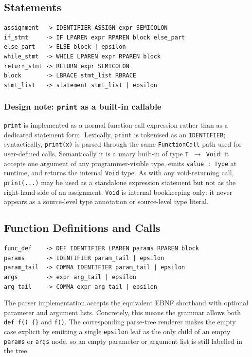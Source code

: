 \subsection{Statements}
\begin{lstlisting}
assignment  -> IDENTIFIER ASSIGN expr SEMICOLON
if_stmt     -> IF LPAREN expr RPAREN block else_part
else_part   -> ELSE block | epsilon
while_stmt  -> WHILE LPAREN expr RPAREN block
return_stmt -> RETURN expr SEMICOLON
block       -> LBRACE stmt_list RBRACE
stmt_list   -> statement stmt_list | epsilon
\end{lstlisting}

\subsubsection*{Design note: \texttt{print} as a built-in callable}
\texttt{print} is implemented as a normal function-call expression rather than
as a dedicated statement form. Lexically, \texttt{print} is tokenised as an
\texttt{IDENTIFIER}; syntactically, \texttt{print(x)} is parsed through the same
\texttt{FunctionCall} path used for user-defined calls. Semantically it is a
unary built-in of type \texttt{T $\rightarrow$ Void}: it accepts one argument
of any programmer-visible type, emits \texttt{value : Type} at runtime, and
returns the internal \texttt{Void} type. As with any void-returning call,
\texttt{print(...)} may be used as a standalone expression statement but not as
the right-hand side of an assignment.
\texttt{Void} is internal bookkeeping only: it never appears as a source-level
type annotation or source-level type literal.

\subsection{Function Definitions and Calls}
\begin{lstlisting}
func_def    -> DEF IDENTIFIER LPAREN params RPAREN block
params      -> IDENTIFIER param_tail | epsilon
param_tail  -> COMMA IDENTIFIER param_tail | epsilon
args        -> expr arg_tail | epsilon
arg_tail    -> COMMA expr arg_tail | epsilon
\end{lstlisting}

The parser implementation accepts the equivalent EBNF shorthand with optional
parameter and argument lists. Concretely, this means the grammar allows both
\texttt{def f() \{\}} and \texttt{f()}. The corresponding parse-tree renderer makes the empty case
explicit by emitting a single \texttt{epsilon} leaf as the only child of an
empty \texttt{params} or \texttt{args} node, so an empty parameter or argument
list is still labelled in the tree.

